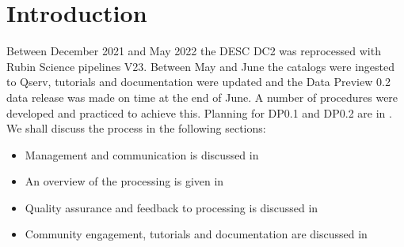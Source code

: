 \section{Introduction}\label{sec:intro}

Between December 2021 and May 2022 the DESC DC2 \citep{2021ApJS..253...31L} was reprocessed with Rubin Science pipelines V23.
Between May and June the catalogs were ingested to Qserv, tutorials and documentation were updated and the Data Preview 0.2 data release was made on time at the end of June.
A number of procedures were developed and practiced to achieve this.
Planning for DP0.1 and DP0.2 are in .
We shall discuss the process in the following sections:

\begin{itemize}
\item  Management and communication is discussed in 
\item An overview of the processing is given in 
\item Quality assurance and feedback to processing is discussed in  
\item Community engagement, tutorials and documentation are discussed in 
\end{itemize}
